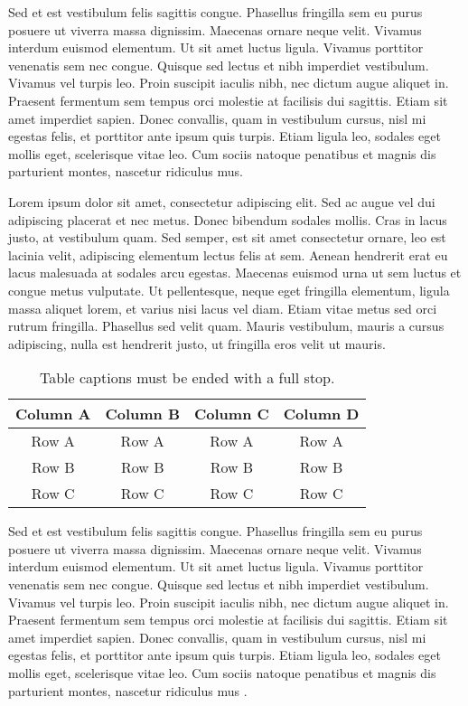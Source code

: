 Sed et est vestibulum felis sagittis congue. Phasellus fringilla sem eu purus 
posuere ut viverra massa dignissim. Maecenas ornare neque velit. Vivamus interdum 
euismod elementum. Ut sit amet luctus ligula. Vivamus porttitor venenatis sem nec 
congue. Quisque sed lectus et nibh imperdiet vestibulum. Vivamus vel turpis leo. 
Proin suscipit iaculis nibh, nec dictum augue aliquet in. Praesent fermentum sem 
tempus orci molestie at facilisis dui sagittis. Etiam sit amet imperdiet sapien. 
Donec convallis, quam in vestibulum cursus, nisl mi egestas felis, et porttitor 
ante ipsum quis turpis. Etiam ligula leo, sodales eget mollis eget, scelerisque 
vitae leo. Cum sociis natoque penatibus et magnis dis parturient montes, nascetur 
ridiculus mus. 

Lorem ipsum dolor sit amet, consectetur adipiscing elit. Sed ac augue vel dui 
adipiscing placerat et nec metus. Donec bibendum sodales mollis. Cras in lacus 
justo, at vestibulum quam. Sed semper, est sit amet consectetur ornare, leo est 
lacinia velit, adipiscing elementum lectus felis at sem. Aenean hendrerit erat eu 
lacus malesuada at sodales arcu egestas. Maecenas euismod urna ut sem luctus et 
congue metus vulputate. Ut pellentesque, neque eget fringilla elementum, ligula 
massa aliquet lorem, et varius nisi lacus vel diam. Etiam vitae metus sed orci 
rutrum fringilla. Phasellus sed velit quam. Mauris vestibulum, mauris a cursus 
adipiscing, nulla est hendrerit justo, ut fringilla eros velit ut mauris.

\begin{table*}
{\setlength{\tabcolsep}{14pt}
\caption{Table captions must be ended with a full stop.}
\begin{center}
\vspace{-6mm}
\begin{tabular}{cccc}
\hline\hline
Column A & Column B & Column C & Column D \\
\hline
Row A & Row A & Row A & Row A \\
Row B & Row B & Row B & Row B \\
Row C & Row C & Row C & Row C \\
\hline
\end{tabular}
\vspace{-6mm}
\end{center}
\label{tableforCh2.3}}
\end{table*}

Sed et est vestibulum felis sagittis congue. Phasellus fringilla sem eu purus 
posuere ut viverra massa dignissim. Maecenas ornare neque velit. Vivamus interdum 
euismod elementum. Ut sit amet luctus ligula. Vivamus porttitor venenatis sem nec 
congue. Quisque sed lectus et nibh imperdiet vestibulum. Vivamus vel turpis leo. 
Proin suscipit iaculis nibh, nec dictum augue aliquet in. Praesent fermentum sem 
tempus orci molestie at facilisis dui sagittis. Etiam sit amet imperdiet sapien. 
Donec convallis, quam in vestibulum cursus, nisl mi egestas felis, et porttitor 
ante ipsum quis turpis. Etiam ligula leo, sodales eget mollis eget, scelerisque 
vitae leo. Cum sociis natoque penatibus et magnis dis parturient montes, nascetur 
ridiculus mus \cite{Zuckerman199486}. 
